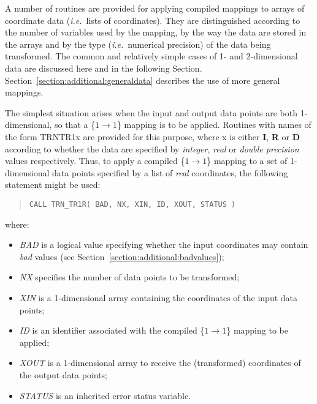 \documentclass[twoside,11pt]{article}
\renewcommand{\_}{\texttt{\symbol{95}}}
\newcommand{\name}[1]{\mbox{\small{#1}}}
\newcommand{\fortvar}[1]{\mbox{\emph{#1}}}
\begin{document}
\label{section:simple:1ddata}

A number of routines are provided for applying compiled mappings to arrays
of coordinate data (\emph{i.e.}\ lists of coordinates).
They are distinguished according to the number of variables used by the
mapping, by the way the data are stored in the arrays and by the type
(\emph{i.e.}\ numerical precision) of the data being transformed.
The common and relatively simple cases of 1- and 2-dimensional data are
discussed here and in the following Section.
Section~\ref{section:additional:generaldata} describes the use of more
general mappings.

The simplest situation arises when the input and output data points are
both 1-dimensional, so that a \mbox{\{$1 \rightarrow 1$\}} mapping is
to be applied.  Routines with names of the form \name{TRN\_TR1x} are
provided for this purpose, where x is either \textbf{I}, \textbf{R} or
\textbf{D} according to whether the data are specified by
\emph{integer}, \emph{real} or \emph{double precision} values
respectively.  Thus, to apply a compiled \mbox{\{$1 \rightarrow 1$\}}
mapping to a set of 1-dimensional data points specified by a list of
\emph{real} coordinates, the following statement might be used:

\begin{quote}
\begin{verbatim}
CALL TRN_TR1R( BAD, NX, XIN, ID, XOUT, STATUS )
\end{verbatim}
\end{quote}

where:

\begin{itemize}

\item \fortvar{BAD} is a logical value specifying whether the input
coordinates may contain \emph{bad} values (see
Section~\ref{section:additional:badvalues});

\item \fortvar{NX} specifies the number of data points to be transformed;

\item \fortvar{XIN} is a 1-dimensional array containing the coordinates of
the input data points;

\item \fortvar{ID} is an identifier associated with the compiled \mbox{\{$1
\rightarrow 1$\}} mapping to be applied;

\item \fortvar{XOUT} is a 1-dimensional array to receive the (transformed)
coordinates of the output data points;

\item \fortvar{STATUS} is an inherited error status variable.

\end{itemize}
\end{document}
